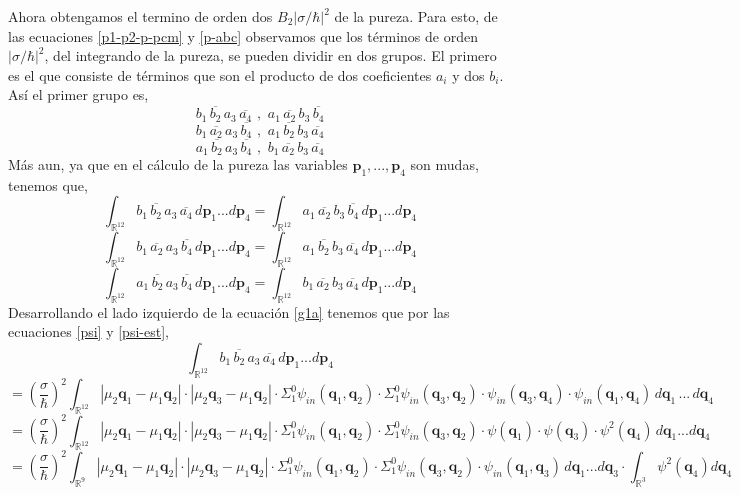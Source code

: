 \documentclass[12pt]{book}
\numberwithin{equation}{chapter}
\def\v{\mathbf}
\def\q{\mathbf{q}}
\def\R{\mathbb{R}}
\def\P{\mathbf{p}}
\begin{document}
Ahora obtengamos el termino de orden dos $B_{2}|\sigma/\hbar|^{2}$ de la pureza. Para esto, de las ecuaciones \eqref{p1-p2-p-pcm} y \eqref{p-abc} observamos que los t\'erminos de orden $|\sigma/\hbar|^{2}$, del integrando de la pureza, se pueden dividir en dos grupos. El primero es el que consiste de t\'erminos que son el producto de dos coeficientes $a_{i}$ y dos $b_{i}$. As\'i el primer grupo es,
$$ b_{1}\,\overline{b_{2}}\,a_{3}\,\overline{a_{4}}  \,\,,\,\,  a_{1}\, \overline{a_{2}}\, b_{3}\, \overline{b_{4}}$$
$$ b_{1}\, \overline{a_{2}} \, a_{3} \, \overline{b_{4}} \,\,,\,\, a_{1}\, \overline{b_{2}} \, b_{3}\, \overline{a_{4}} $$
$$a_{1}\, \overline{b_{2}} \, a_{3} \, \overline{b_{4}} \,\,,\,\, b_{1}\, \overline{a_{2}} \, b_{3}\, \overline{a_{4}} $$
M\'as aun, ya que en el c\'alculo de la pureza las variables $\P_{1},...,\P_{4}$ son mudas, tenemos que,
\begin{equation}\label{g1a}
\int_{\R^{12}} b_{1}\,\overline{b_{2}}\,a_{3}\,\overline{a_{4}} \,d\P_{1}...d\P_{4} = \int_{\R^{12}} a_{1}\, \overline{a_{2}}\, b_{3}\, \overline{b_{4}} \,d\P_{1}...d\P_{4}
\end{equation}
\begin{equation}\label{g1b}
\int_{\R^{12}} b_{1}\, \overline{a_{2}} \, a_{3} \, \overline{b_{4}} \,d\P_{1}...d\P_{4} = \int_{\R^{12}} a_{1}\, \overline{b_{2}} \, b_{3}\, \overline{a_{4}} \,d\P_{1}...d\P_{4}
\end{equation}
\begin{equation}\label{g1c}
\int_{\R^{12}} a_{1}\, \overline{b_{2}} \, a_{3} \, \overline{b_{4}} \,d\P_{1}...d\P_{4} = \int_{\R^{12}} b_{1}\, \overline{a_{2}} \, b_{3}\, \overline{a_{4}} \,d\P_{1}...d\P_{4}
\end{equation}
Desarrollando el lado izquierdo de la ecuaci\'on \eqref{g1a} tenemos que por las ecuaciones \eqref{psi} y \eqref{psi-est},
$$\int_{\R^{12}} b_{1}\,\overline{b_{2}}\,a_{3}\,\overline{a_{4}} \,d\P_{1}...d\P_{4} $$
$$= \left( \frac{\sigma}{\hbar} \right)^{2} \int_{\R^{12}} |\mu_{2}\q_{1}-\mu_{1}\q_{2}|\cdot |\mu_{2}\q_{3}-\mu_{1}\q_{2}|\cdot \Sigma_{1}^{0} \psi_{in}(\q_{1},\q_{2}) \cdot \Sigma_{1}^{0}\psi_{in}(\q_{3},\q_{2})\cdot \psi_{in}(\q_{3},\q_{4})\cdot \psi_{in}(\q_{1},\q_{4}) \,d\v{q}_{1}\,...\,d\v{q}_{4} $$
$$= \left( \frac{\sigma}{\hbar} \right)^{2} \int_{\R^{12}}|\mu_{2}\q_{1}-\mu_{1}\q_{2}|\cdot |\mu_{2}\q_{3}-\mu_{1}\q_{2}|\cdot \Sigma_{1}^{0} \psi_{in}(\q_{1},\q_{2}) \cdot \Sigma_{1}^{0}\psi_{in}(\q_{3},\q_{2})\cdot \psi(\q_{1}) \cdot \psi(\q_{3}) \cdot \psi^{2}(\q_{4})\,d\v{q}_{1}...d\v{q}_{4} $$
$$=\left( \frac{\sigma}{\hbar} \right)^{2} \int_{\R^{9}}|\mu_{2}\q_{1}-\mu_{1}\q_{2}|\cdot |\mu_{2}\q_{3}-\mu_{1}\q_{2}|\cdot \Sigma_{1}^{0} \psi_{in}(\q_{1},\q_{2}) \cdot \Sigma_{1}^{0}\psi_{in}(\q_{3},\q_{2})\cdot \psi_{in}(\q_{1},\q_{3})\,d\v{q}_{1}...d\v{q}_{3}\cdot \int_{\R^{3}}\psi^{2}(\q_{4}) d\q_{4} $$
\end{document}
